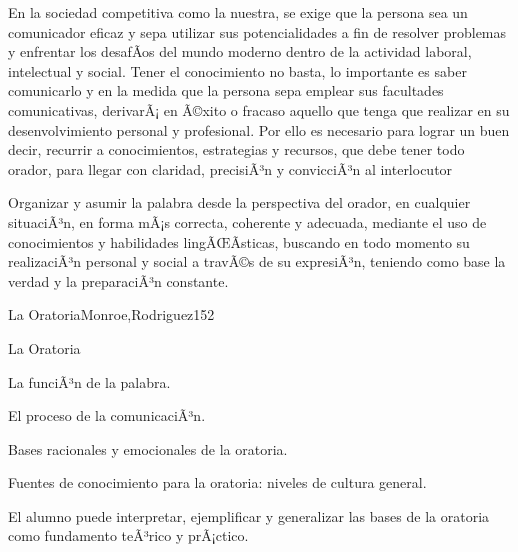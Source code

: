 \begin{syllabus}


\begin{justification}
En la sociedad competitiva como la nuestra,  se exige que la persona sea un comunicador eficaz y  sepa utilizar sus potencialidades a fin de resolver problemas y enfrentar los desafÃ­os del mundo moderno dentro de la actividad laboral, intelectual y social. Tener el conocimiento no basta, lo importante es saber comunicarlo y en la medida que la persona sepa emplear sus facultades comunicativas, derivarÃ¡ en Ã©xito o fracaso aquello que tenga que realizar en su desenvolvimiento personal y profesional. Por ello es necesario para lograr un buen decir, recurrir a conocimientos, estrategias y recursos, que debe tener todo orador, para llegar con claridad, precisiÃ³n y convicciÃ³n al interlocutor
\end{justification}

\begin{goals}
\item Organizar y asumir la palabra desde la perspectiva del orador, en cualquier situaciÃ³n, en forma mÃ¡s correcta, coherente  y adecuada, mediante el uso de conocimientos y habilidades lingÃŒÃ­sticas, buscando en todo momento su realizaciÃ³n personal y social  a travÃ©s de su expresiÃ³n, teniendo como base  la verdad y la preparaciÃ³n constante.  
\end{goals}

\begin{outcomes}
\end{outcomes}

\begin{unit}{La Oratoria}{Monroe,Rodriguez}{15}{2}
\begin{topics}
	\item La Oratoria
	\item La funciÃ³n de la palabra.
	\item El proceso de la comunicaciÃ³n.
	\item Bases racionales y emocionales de la oratoria.
	\item Fuentes de conocimiento para la oratoria: niveles de cultura general.
\end{topics}
\begin{unitgoals}
	\item El alumno puede interpretar, ejemplificar y generalizar las bases de la oratoria como fundamento teÃ³rico  y  prÃ¡ctico.
\end{unitgoals}
\end{unit}


\end{syllabus}
